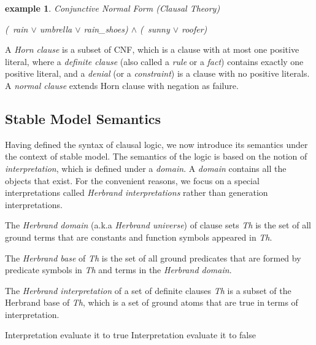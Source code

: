 \documentclass[12pt,twoside]{report}
\newtheorem{examp}{example}[section]
\begin{document}
\begin{examp} \normalfont Conjunctive Normal Form (Clausal Theory)
\begin{center}
 \textit{(~rain $\vee$ umbrella $\vee$ rain\_shoes) $\wedge$ (~sunny $\vee$ roofer)}
\end{center}
\end{examp}

A \textit{Horn clause} is a subset of CNF, which is a clause with at most one positive literal, where a \textit{definite clause} (also called a \textit{rule} or a \textit{fact}) contains exactly one positive literal, and a \textit{denial} (or a \textit{constraint}) is a clause with no positive literals.
A \textit{normal clause} extends Horn clause with negation as failure.
\\

\subsection{Stable Model Semantics}

Having defined the syntax of clausal logic, we now introduce its semantics under the context of stable model. The semantics of the logic is based on the notion of \textit{interpretation}, which is defined under a \textit{domain}. A \textit{domain} contains all the objects that exist.  For the convenient reasons, we focus on a special interpretations called \textit{Herbrand interpretations} rather than generation interpretations.

The \textit{Herbrand domain} (a.k.a \textit{Herbrand universe}) of clause sets \textit{Th} is the set of all ground terms that are constants and function symbols appeared in \textit{Th}.

The \textit{Herbrand base} of \textit{Th} is the set of all ground predicates that are formed by predicate symbols in \textit{Th} and terms in the \textit{Herbrand domain}.

The \textit{Herbrand interpretation} of a set of definite clauses \textit{Th} is a subset of the Herbrand base of \textit{Th}, which is a set of ground atoms that are true in terms of interpretation.

Interpretation evaluate it to true
Interpretation evaluate it to false
\end{document}
